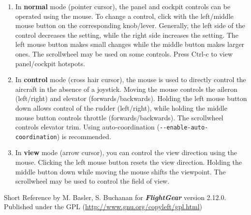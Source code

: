 \documentclass[10pt]{article}
\newcommand{\FlightGear}{{\itshape\bfseries FlightGear}}
\newcommand{\web}[1]{\href{#1}{#1}}
\begin{document}
 \begin{enumerate}
 \item In \textbf{normal} mode (pointer cursor), the panel and cockpit controls can be
 operated using the mouse. To change a control, click with the left/middle mouse button
 on the corresponding knob/lever. Generally, the left side of the control decreases the setting,
 while the right side increases the setting. The left mouse button makes small changes while the
 middle button makes larger ones. The scrollwheel may be used on some controls.
 Press Ctrl-c to view panel/cockpit hotspots.

 \item In \textbf{control} mode (cross hair cursor), the mouse is used to directly control
 the aircraft in the absence of a joystick. Moving the mouse controls the aileron (left/right)
 and elevator (forwards/backwards). Holding the left mouse button down allows control of the rudder (left/right), while holding the middle mouse button controls throttle (forwards/backwards). The scrollwheel controls
 elevator trim. Using auto-coordination (\texttt{-$ $-enable-auto-coordination}) is recommended.

 \item In \textbf{view} mode (arrow cursor), you can control the view direction using the mouse.
 Clicking the left mouse button resets the view direction. Holding the middle button down while
 moving the mouse shifts the viewpoint. The scrollwheel may be used to control the field of view.

\end{enumerate}

 \noindent
 Short Reference by M. Basler, S. Buchanan for \FlightGear{} version 2.12.0.\\
 Published under the GPL (\web{http://www.gnu.org/copyleft/gpl.html})
\end{document}
